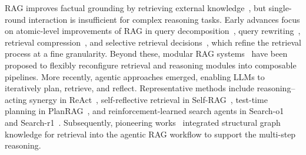 RAG improves factual grounding by retrieving external knowledge~\citep{rag}, but single-round interaction is insufficient for complex reasoning tasks. Early advances focus on atomic-level improvements of RAG in query decomposition~\citep{decomposition}, query rewriting~\citep{queryrewrite,rqrag}, retrieval compression~\citep{recomp}, and selective retrieval decisions~\citep{slimplm}, which refine the retrieval process at a fine granularity. Beyond these, modular RAG systems~\citep{modularrag,flashrag,composerag} have been proposed to flexibly reconfigure retrieval and reasoning modules into composable pipelines. More recently, agentic approaches emerged, enabling LLMs to iteratively plan, retrieve, and reflect. Representative methods include reasoning–acting synergy in ReAct~\citep{react}, self-reflective retrieval in Self-RAG~\citep{selfrag}, test-time planning in PlanRAG~\citep{planrag}, and reinforcement-learned search agents in Search-o1~\citep{searcho1} and Search-r1~\citep{searchr1}. Subsequently, pioneering works~\citep{tog, tog2, gear, hybgrag} integrated structural graph knowledge for retrieval into the agentic RAG workflow to support the multi-step reasoning.

